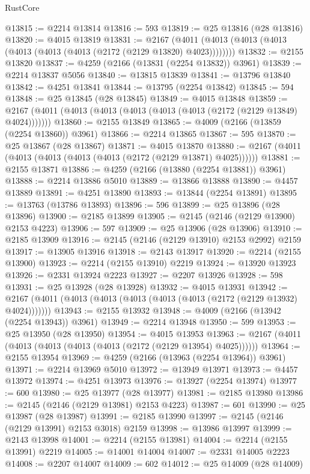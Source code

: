 \begin{lexlean}{RustCore}
\begin{coremodule}
@13815 := @2214 @13814
@13816 := 593
@13819 := @25 @13816 (@28 @13816)
@13820 := @4015 @13819
@13831 := @2167 (@4011 (@4013 (@4013 (@4013 (@4013 (@4013 (@4013 (@2172 (@2129 @13820) @4023))))))))
@13832 := @2155 @13820
@13837 := @4259 (@2166 (@13831 (@2254 @13832)) @3961)
@13839 := @2214 @13837 @5056
@13840 := @13815 @13839
@13841 := @13796 @13840
@13842 := @4251 @13841
@13844 := @13795 (@2254 @13842)
@13845 := 594
@13848 := @25 @13845 (@28 @13845)
@13849 := @4015 @13848
@13859 := @2167 (@4011 (@4013 (@4013 (@4013 (@4013 (@4013 (@2172 (@2129 @13849) @4024)))))))
@13860 := @2155 @13849
@13865 := @4009 (@2166 (@13859 (@2254 @13860)) @3961)
@13866 := @2214 @13865
@13867 := 595
@13870 := @25 @13867 (@28 @13867)
@13871 := @4015 @13870
@13880 := @2167 (@4011 (@4013 (@4013 (@4013 (@4013 (@2172 (@2129 @13871) @4025))))))
@13881 := @2155 @13871
@13886 := @4259 (@2166 (@13880 (@2254 @13881)) @3961)
@13888 := @2214 @13886 @5010
@13889 := @13866 @13888
@13890 := @4457 @13889
@13891 := @4251 @13890
@13893 := @13844 (@2254 @13891)
@13895 := @13763 (@13786 @13893)
@13896 := 596
@13899 := @25 @13896 (@28 @13896)
@13900 := @2185 @13899
@13905 := @2145 (@2146 (@2129 @13900) @2153 @4223)
@13906 := 597
@13909 := @25 @13906 (@28 @13906)
@13910 := @2185 @13909
@13916 := @2145 (@2146 (@2129 @13910) @2153 @2992) @2159
@13917 := @13905 @13916
@13918 := @2143 @13917
@13920 := @2214 (@2155 @13900)
@13923 := @2214 (@2155 @13910) @2219
@13924 := @13920 @13923
@13926 := @2331 @13924 @2223
@13927 := @2207 @13926
@13928 := 598
@13931 := @25 @13928 (@28 @13928)
@13932 := @4015 @13931
@13942 := @2167 (@4011 (@4013 (@4013 (@4013 (@4013 (@4013 (@2172 (@2129 @13932) @4024)))))))
@13943 := @2155 @13932
@13948 := @4009 (@2166 (@13942 (@2254 @13943)) @3961)
@13949 := @2214 @13948
@13950 := 599
@13953 := @25 @13950 (@28 @13950)
@13954 := @4015 @13953
@13963 := @2167 (@4011 (@4013 (@4013 (@4013 (@4013 (@2172 (@2129 @13954) @4025))))))
@13964 := @2155 @13954
@13969 := @4259 (@2166 (@13963 (@2254 @13964)) @3961)
@13971 := @2214 @13969 @5010
@13972 := @13949 @13971
@13973 := @4457 @13972
@13974 := @4251 @13973
@13976 := @13927 (@2254 @13974)
@13977 := 600
@13980 := @25 @13977 (@28 @13977)
@13981 := @2185 @13980
@13986 := @2145 (@2146 (@2129 @13981) @2153 @4223)
@13987 := 601
@13990 := @25 @13987 (@28 @13987)
@13991 := @2185 @13990
@13997 := @2145 (@2146 (@2129 @13991) @2153 @3018) @2159
@13998 := @13986 @13997
@13999 := @2143 @13998
@14001 := @2214 (@2155 @13981)
@14004 := @2214 (@2155 @13991) @2219
@14005 := @14001 @14004
@14007 := @2331 @14005 @2223
@14008 := @2207 @14007
@14009 := 602
@14012 := @25 @14009 (@28 @14009)

\end{coremodule}
\end{lexlean}
